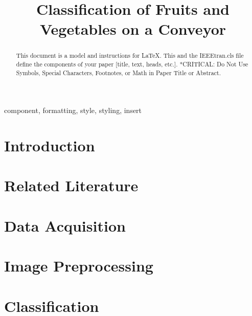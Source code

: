 \documentclass[conference]{IEEEtran}
\begin{document}
	
	\title{Classification of Fruits and Vegetables on a Conveyor}
		\author{
		\and
		\and
	}
	
	\maketitle
	
	\begin{abstract}
		This document is a model and instructions for \LaTeX.
		This and the IEEEtran.cls file define the components of your paper [title, text, heads, etc.]. *CRITICAL: Do Not Use Symbols, Special Characters, Footnotes, 
		or Math in Paper Title or Abstract.
	\end{abstract}
	
	\begin{IEEEkeywords}
		component, formatting, style, styling, insert
	\end{IEEEkeywords}
	
	\section{Introduction}
	
	
	\section{Related Literature}
	
	
	\section{Data Acquisition}
	
	
	\section{Image Preprocessing} \label{preprocessing}
	
	
	\section{Classification} \label{classifiers}
	
	
\end{document}
